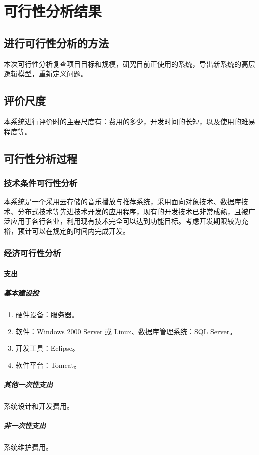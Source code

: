 \chapter{可行性分析结果}
\section{进行可行性分析的方法}
本次可行性分析复查项目目标和规模，研究目前正使用的系统，导出新系统的高层逻辑模型，重新定义问题。

\section{评价尺度}
本系统进行评价时的主要尺度有：费用的多少，开发时间的长短，以及使用的难易程度等。
\section{可行性分析过程}
\subsection{技术条件可行性分析}
本系统是一个采用云存储的音乐播放与推荐系统，采用面向对象技术、数据库技术、分布式技术等先进技术开发的应用程序，现有的开发技术已非常成熟，且被广泛应用于各行各业，利用现有技术完全可以达到功能目标。考虑开发期限较为充裕，预计可以在规定的时间内完成开发。  
\subsection{经济可行性分析}
\subsubsection{支出}
\paragraph{基本建设投}
\begin{enumerate} 
	\item 硬件设备：服务器。  
	\item 软件：Windows 2000 Server 或 Linux、数据库管理系统：SQL Server。
	\item 开发工具：Eclipse。 
	\item 软件平台：Tomcat。
\end{enumerate} 
\paragraph{其他一次性支出}
系统设计和开发费用。 
\paragraph{非一次性支出}
系统维护费用。 
